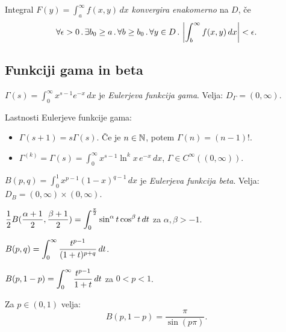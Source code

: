\begin{definicija}
    Integral \(F(y) = \int_{a}^{\infty} f(x,y) \, dx\) \emph{konvergira enakomerno} na \(D\), če 
    $$\forall \epsilon > 0 \,.\, \exists b_0 \geq a \,.\, \forall b \geq b_0 \,.\, \forall y \in D \,.\, \left|\int_{b}^{\infty} f(x,y) \, dx \right| < \epsilon.$$
\end{definicija}

\subsection{Funkciji gama in beta}
\begin{definicija}
    $\Gamma (s) = \int_{0}^{\infty} x^{s-1}e^{-x} \, dx$ je \emph{Eulerjeva funkcija gama}. Velja: $D_\Gamma = (0, \infty)$.
\end{definicija}

\begin{trditev}
    Lastnosti Eulerjeve funkcije gama:
    \begin{itemize}
        \item \(\Gamma(s+1) = s \Gamma(s)\). Če je \(n \in \mathbb{N}\), potem \(\Gamma(n) = (n-1)!\).
        \item \(\Gamma^{(k)} = \Gamma (s) = \int_{0}^{\infty} x^{s-1} \ln^k x \, e^{-x} \, dx\), \(\Gamma \in C^\infty ((0, \infty))\).
    \end{itemize}
\end{trditev}

\begin{definicija}
    \( B(p,q) = \int_{0}^{1}x^{p-1}(1-x)^{q-1} \, dx\) je \emph{Eulerjeva funkcija beta}. Velja: \(D_B = (0, \infty) \times (0, \infty)\).
\end{definicija}

\begin{trditev}
    \(\displaystyle \frac{1}{2} B(\frac{\alpha + 1}{2}, \frac{\beta + 1}{2}) = \int_{0}^{\frac{\pi}{2}} \sin^\alpha t \cos^\beta t \, dt\) za \(\alpha, \beta > -1\).
\end{trditev}

\begin{trditev}
    \(\displaystyle B(p,q) = \int_{0}^{\infty} \frac{t^{p-1}}{(1+t)^{p+q}} \, dt\).
\end{trditev}

\begin{posledica}
    \(\displaystyle B(p, 1-p) = \int_{0}^{\infty} \frac{t^{p-1}}{1+t} \, dt\) za \(0<p<1\).
\end{posledica}

\begin{opomba}
    Za \(p \in (0,1)\) velja: \[B(p, 1-p) = \frac{\pi}{\sin (p \pi)}.\]
\end{opomba}

